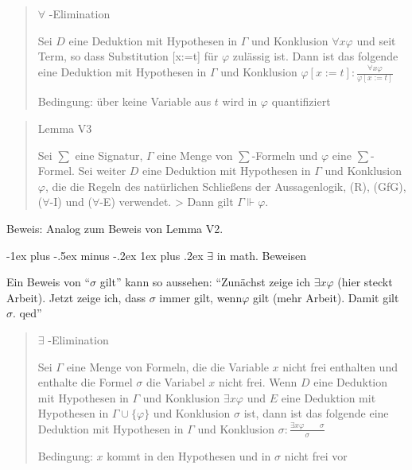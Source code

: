 \documentclass[a4paper]{article}
\makeatletter
\renewcommand{\subsubsection}{\@startsection{subsubsection}{3}{0mm}%
                {-1ex plus -.5ex minus -.2ex}%
                {1ex plus .2ex}%
                {\normalfont\small\bfseries}}
\makeatother
\begin{document}
\begin{multicols}{3}
  \begin{quote}
    $\forall$ -Elimination

    Sei $D$ eine Deduktion mit Hypothesen in $\Gamma$ und Konklusion
    $\forall x\varphi$ und seit Term, so dass Substitution {[}x:=t{]} für
    $\varphi$ zulässig ist. Dann ist das folgende eine Deduktion mit
    Hypothesen in $\Gamma$ und Konklusion
    $\varphi[x:=t]:\frac{\forall x\varphi}{\varphi[x:=t]}$

    Bedingung: über keine Variable aus $t$ wird in $\varphi$ quantifiziert
  \end{quote}

  \begin{quote}
    Lemma V3

    Sei $\sum$ eine Signatur, $\Gamma$ eine Menge von $\sum$-Formeln und
    $\varphi$ eine $\sum$-Formel. Sei weiter $D$ eine Deduktion mit
    Hypothesen in $\Gamma$ und Konklusion $\varphi$, die die Regeln des
    natürlichen Schließens der Aussagenlogik, (R), (GfG), ($\forall$-I) und
    ($\forall$-E) verwendet. \textgreater{} Dann gilt $\Gamma\Vdash\varphi$.
  \end{quote}

  Beweis: Analog zum Beweis von Lemma V2.

  \subsubsection{$\exists$ in math.
    Beweisen}\label{exists-in-math.-beweisen}

  Ein Beweis von ``$\sigma$ gilt'' kann so aussehen: ``Zunächst zeige ich
  $\exists x\varphi$ (hier steckt Arbeit). Jetzt zeige ich, dass $\sigma$
  immer gilt, wenn$\varphi$ gilt (mehr Arbeit). Damit gilt $\sigma$. qed''

  \begin{quote}
    $\exists$ -Elimination

    Sei $\Gamma$ eine Menge von Formeln, die die Variable $x$ nicht frei
    enthalten und enthalte die Formel $\sigma$ die Variabel $x$ nicht frei.
    Wenn $D$ eine Deduktion mit Hypothesen in $\Gamma$ und Konklusion
    $\exists x\varphi$ und $E$ eine Deduktion mit Hypothesen in
    $\Gamma\cup\{\varphi\}$ und Konklusion $\sigma$ ist, dann ist das
    folgende eine Deduktion mit Hypothesen in $\Gamma$ und Konklusion
    $\sigma:\frac{\exists x\varphi \quad\quad \sigma}{\sigma}$

    Bedingung: $x$ kommt in den Hypothesen und in $\sigma$ nicht frei vor
  \end{quote}


\end{multicols}
\end{document}
